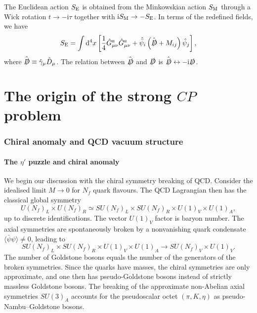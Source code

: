 \documentclass[review]{elsarticle}
\numberwithin{equation}{section}
\numberwithin{table}{section}
\numberwithin{figure}{section}
\def\d{\mathrm{d}}
\def\i{\mathrm{i}}
\begin{document}
The Euclidean action $S_{\rm E}$ is obtained from the Minkowskian action $S_{\rm M}$ through a Wick rotation $t\rightarrow -\i\tau$ together with $\i S_{\rm M}\rightarrow -S_{\rm E}$. In terms of the redefined fields, we have 
\begin{align}
    S_{\rm E} = \int\d^4 x\left[\frac{1}{4}\hat{G}^a_{\mu\nu}\hat{G}^a_{\mu\nu} + \hat{\bar{\psi}}_i\left(\hat{\slashed{D}} + M_{ij}\right)\hat{\psi}_j\right],
\end{align}
where $\hat{\slashed{D}}\equiv \hat{\gamma}_\mu \hat{D}_\mu$. The relation between $\hat{\slashed{D}}$ and $\slashed{D}$ is $\hat{\slashed{D}}\leftrightarrow -\i\slashed{D}$.


\part{The origin of the strong \texorpdfstring{$CP$}{CP} problem}
\label{part:origin}

\section{Chiral anomaly and QCD vacuum structure}

\subsection{The \texorpdfstring{$\eta'$}{eta-prime} puzzle and chiral anomaly}

We begin our discussion with the chiral symmetry breaking of QCD. Consider the idealised limit $M\to 0$
for $N_f$ quark flavours. The QCD Lagrangian then has the classical global symmetry
\begin{equation}
    U(N_f)_L \times U(N_f)_R \simeq SU(N_f)_L \times SU(N_f)_R \times U(1)_V \times U(1)_A,
\end{equation}
up to discrete identifications. The vector $U(1)_V$ factor is baryon number. The axial symmetries are spontaneously broken by a
nonvanishing quark condensate $\langle \bar{\psi}\psi\rangle\neq 0$, leading to
\begin{equation}
    SU(N_f)_L \times SU(N_f)_R \times U(1)_V \times U(1)_A \rightarrow SU(N_f)_V \times U(1)_V.
    \label{eq:chiral-symmetry-breaking-without-anomaly}
\end{equation}
The number of Goldstone bosons equals the number of the generators of the broken symmetries. Since the quarks have masses, the chiral symmetries are only approximate, and one then has pseudo-Goldstone bosons instead of strictly massless Goldstone bosons. The breaking of the approximate non-Abelian axial symmetries $SU(3)_A$ accounts for the pseudoscalar octet $(\pi,K,\eta)$ as pseudo-Nambu--Goldstone bosons.
\end{document}
